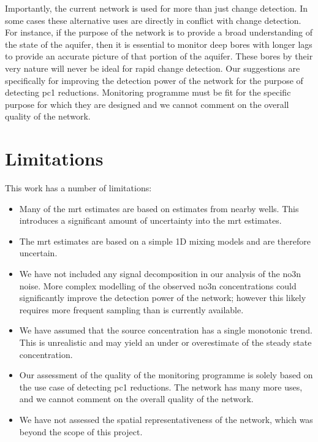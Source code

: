 Importantly, the current network is used for more than just change detection.
In some cases these alternative uses are directly in conflict with change detection.
For instance, if the purpose of the network is to provide a broad understanding of the state of the aquifer, then it is essential to monitor deep bores with longer lags to provide an accurate picture of that portion of the aquifer.
These bores by their very nature will never be ideal for rapid change detection.
Our suggestions are specifically for improving the detection power of the network for the purpose of detecting \gls{pc1} reductions.
Monitoring programme must be fit for the specific purpose for which they are designed and we cannot comment on the overall quality of the network.

\section[Limitations]{Limitations}

This work has a number of limitations:
\begin{itemize}
    \item Many of the \gls{mrt} estimates are based on estimates from nearby wells. This introduces a significant amount of uncertainty into the \gls{mrt} estimates.
    \item The \gls{mrt} estimates are based on a simple 1D mixing models and are therefore uncertain.
    \item We have not included any signal decomposition in our analysis of the \gls{no3n} noise. More complex modelling of the observed \gls{no3n} concentrations could significantly improve the detection power of the network; however this likely requires more frequent sampling than is currently available.
    \item We have assumed that the source concentration has a single monotonic trend. This is unrealistic and may yield an under or overestimate of the steady state concentration.
    \item Our assessment of the quality of the monitoring programme is solely based on the use case of detecting \gls{pc1} reductions. The network has many more uses, and we cannot comment on the overall quality of the network.
    \item We have not assessed the spatial representativeness of the network, which was beyond the scope of this project.
\end{itemize}
